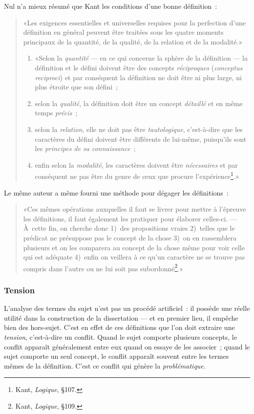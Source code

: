 \documentclass[a4paper,11pt]{article}
\newcommand{\cad}{c'est-à-dire}
\begin{document}
Nul n'a mieux résumé que Kant les conditions d'une bonne définition~:
\begin{quote}
  «Les exigences essentielles et universelles requises pour la
  perfection d'une définition en général peuvent être traitées sous les
  quatre moments principaux de la quantité, de la qualité, de la
  relation et de la modalité.»

  \begin{enumerate}
  \item «Selon la \emph{quantité} --- en ce qui concerne la sphère de la
    définition --- la définition et le défini doivent être des concepts
    \emph{réciproques} (\emph{conceptus reciproci}) et par conséquent la
    définition ne doit être ni plus large, ni plus étroite que son défini~;
  \item selon la \emph{qualité}, la définition doit être un concept
    \emph{détaillé} et en même temps \emph{précis}~;
  \item selon la \emph{relation}, elle ne doit pas être
    \emph{tautologique}, \cad{} que les caractères du défini doivent
    être différents de lui-même, puisqu'ils sont les \emph{principes de
      sa connaissance}~;
  \item enfin selon la \emph{modalité}, les caractères doivent être
    \emph{nécessaires} et par conséquent ne pas être du genre de ceux
    que procure l'expérience\footnote{Kant, \emph{Logique}, §107.}.»
  \end{enumerate}
\end{quote}
Le même auteur a même fourni une méthode pour dégager les définitions~: 
\begin{quote}
  «Ces mêmes opérations auxquelles il faut se livrer pour mettre à
  l'épreuve les définitions, il faut également les pratiquer pour
  élaborer celles-ci. --- À~cette fin, on cherche donc 1)~des
  propositions vraies 2)~telles que le prédicat ne présuppose pas le
  concept de la chose 3)~on en rassemblera plusieurs et on les comparera
  au concept de la chose même pour voir celle qui est adéquate 4)~enfin
  on veillera à ce qu'un caractère ne se trouve pas compris dans l'autre
  ou ne lui soit pas subordonné\footnote{Kant, \emph{Logique}, §109.}.»
\end{quote}

\subsubsection{Tension}

L'analyse des termes du sujet n'est pas un procédé artificiel~: il
possède une réelle utilité dans la construction de la dissertation ---
et en premier lieu, il empêche bien des hors-sujet. C'est en effet de
ces définitions que l'on doit extraire une \emph{tension}, \cad{} un
conflit. Quand le sujet comporte plusieurs concepts, le conflit apparaît
généralement entre eux quand on essaye de les associer~; quand le sujet
comporte un seul concept, le conflit apparaît souvent entre les termes
mêmes de la définition. C'est ce conflit qui génère la
\emph{problématique}.
\end{document}
